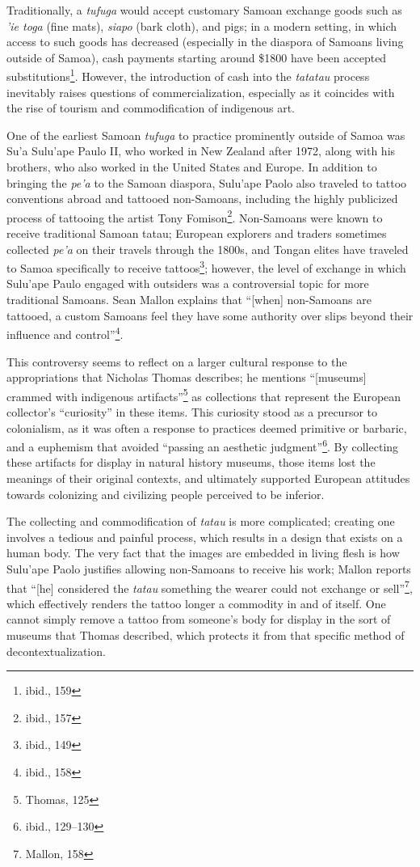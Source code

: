 Traditionally, a \textit{tufuga} would accept customary Samoan exchange goods
such as \textit{'ie toga} (fine mats), \textit{siapo} (bark cloth), and pigs; in
a modern setting, in which access to such goods has decreased (especially in the
diaspora of Samoans living outside of Samoa), cash payments starting around
\$1800 have been accepted substitutions\footnote{ibid., 159}. However, the
introduction of cash into the \textit{tatatau} process inevitably raises
questions of commercialization, especially as it coincides with the rise of
tourism and commodification of indigenous art.

One of the earliest Samoan \textit{tufuga} to practice prominently outside of
Samoa was Su'a Sulu'ape Paulo II, who worked in New Zealand after 1972, along
with his brothers, who also worked in the United States and Europe. In addition
to bringing the \textit{pe'a} to the Samoan diaspora, Sulu'ape Paolo also
traveled to tattoo conventions abroad and tattooed non-Samoans, including the
highly publicized process of tattooing the artist Tony Fomison\footnote{ibid.,
157}. Non-Samoans were known to receive traditional Samoan tatau; European
explorers and traders sometimes collected \textit{pe'a} on their travels through
the 1800s, and Tongan elites have traveled to Samoa specifically to receive
tattoos\footnote{ibid., 149}; however, the level of exchange in which Sulu'ape
Paulo engaged with outsiders was a controversial topic for more traditional
Samoans. Sean Mallon explains that ``[when] non-Samoans are tattooed, a custom
Samoans feel they have some authority over slips beyond their influence and
control''\footnote{ibid., 158}.

This controversy seems to reflect on a larger cultural response to the
appropriations that Nicholas Thomas describes; he mentions ``[museums] crammed
with indigenous artifacts''\footnote{Thomas, 125} as collections that represent
the European collector's ``curiosity'' in these items. This curiosity stood as a
precursor to colonialism, as it was often a response to practices deemed
primitive or barbaric, and a euphemism that avoided ``passing an aesthetic
judgment''\footnote{ibid., 129–130}. By collecting these artifacts for display
in natural history museums, those items lost the meanings of their original
contexts, and ultimately supported European attitudes towards colonizing and
civilizing people perceived to be inferior.

The collecting and commodification of \textit{tatau} is more complicated;
creating one involves a tedious and painful process, which results in a design
that exists on a human body. The very fact that the images are embedded in
living flesh is how Sulu'ape Paolo justifies allowing non-Samoans to receive his
work; Mallon reports that ``[he] considered the \textit{tatau} something the
wearer could not exchange or sell''\footnote{Mallon, 158}, which effectively
renders the tattoo longer a commodity in and of itself. One cannot simply remove
a tattoo from someone's body for display in the sort of museums that Thomas
described, which protects it from that specific method of decontextualization.

